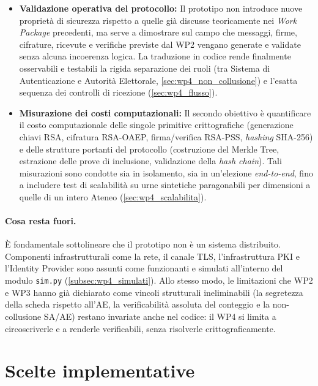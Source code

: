 \begin{itemize}
  \item \textbf{Validazione operativa del protocollo:} Il prototipo non introduce nuove proprietà di sicurezza rispetto a quelle già discusse teoricamente nei \emph{Work Package} precedenti, ma serve a dimostrare sul campo che messaggi, firme, cifrature, ricevute e verifiche previste dal WP2 vengano generate e validate senza alcuna incoerenza logica. La traduzione in codice rende finalmente osservabili e testabili la rigida separazione dei ruoli (tra Sistema di Autenticazione e Autorità Elettorale, \ref{sec:wp4_non_collusione}) e l'esatta sequenza dei controlli di ricezione (\ref{sec:wp4_flusso}).
  
  \item \textbf{Misurazione dei costi computazionali:} Il secondo obiettivo è quantificare il costo computazionale delle singole primitive crittografiche (generazione chiavi RSA, cifratura RSA-OAEP, firma/verifica RSA-PSS, \emph{hashing} SHA-256) e delle strutture portanti del protocollo (costruzione del Merkle Tree, estrazione delle prove di inclusione, validazione della \emph{hash chain}). Tali misurazioni sono condotte sia in isolamento, sia in un'elezione \emph{end-to-end}, fino a includere test di scalabilità su urne sintetiche paragonabili per dimensioni a quelle di un intero Ateneo (\ref{sec:wp4_scalabilita}).
\end{itemize}

\paragraph{Cosa resta fuori.} 
È fondamentale sottolineare che il prototipo non è un sistema distribuito. Componenti infrastrutturali come la rete, il canale TLS, l'infrastruttura PKI e l'Identity Provider sono assunti come funzionanti e simulati all'interno del modulo \texttt{sim.py} (\ref{subsec:wp4_simulati}). Allo stesso modo, le limitazioni che WP2 e WP3 hanno già dichiarato come vincoli strutturali ineliminabili (la segretezza della scheda rispetto all'AE, la verificabilità assoluta del conteggio e la non-collusione SA/AE) restano invariate anche nel codice: il WP4 si limita a circoscriverle e a renderle verificabili, senza risolverle crittograficamente.

\section{Scelte implementative}
\label{sec:wp4_scelte}

